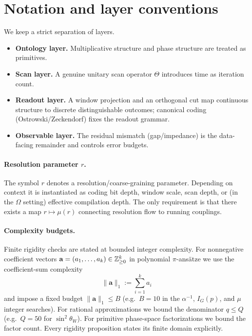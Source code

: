 \section{Notation and layer conventions}
\label{app:notation_layers}

We keep a strict separation of layers.

\begin{itemize}
    \item \textbf{Ontology layer.} Multiplicative structure and phase structure are treated as primitives.
    \item \textbf{Scan layer.} A genuine unitary scan operator $\Theta$ introduces time as iteration count.
    \item \textbf{Readout layer.} A window projection and an orthogonal cut map continuous structure to discrete distinguishable outcomes; canonical coding (Ostrowski/Zeckendorf) fixes the readout grammar.
    \item \textbf{Observable layer.} The residual mismatch (gap/impedance) is the data-facing remainder and controls error budgets.
\end{itemize}

\paragraph{Resolution parameter $r$.}
The symbol $r$ denotes a resolution/coarse-graining parameter. Depending on context it is instantiated as coding bit depth, window scale, scan depth, or (in the $\Omega$ setting) effective compilation depth. The only requirement is that there exists a map $r\mapsto \mu(r)$ connecting resolution flow to running couplings.

\paragraph{Complexity budgets.}
Finite rigidity checks are stated at bounded integer complexity. For nonnegative coefficient vectors $\mathbf{a}=(a_1,\dots,a_k)\in\mathbb{Z}_{\ge 0}^k$ in polynomial $\pi$-ans\"atze we use the coefficient-sum complexity
\[
\|\mathbf{a}\|_1:=\sum_{i=1}^k a_i
\]
and impose a fixed budget $\|\mathbf{a}\|_1\le B$ (e.g.\ $B=10$ in the $\alpha^{-1}$, $I_G(p)$, and $\mu$ integer searches). For rational approximations we bound the denominator $q\le Q$ (e.g.\ $Q=50$ for $\sin^2\theta_W$). For primitive phase-space factorizations we bound the factor count. Every rigidity proposition states its finite domain explicitly.

